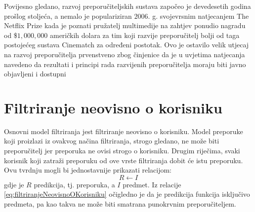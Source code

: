 \documentclass[times, utf8, diplomski, numeric]{fer}
\begin{document}
Povijesno gledano, razvoj preporučiteljskih sustava započeo je devedesetih
godina prošlog stoljeća, a nemalo je populariziran $2006$. g. svojevrsnim
natjecanjem \glqq The Netflix Prize \grqq kada je poznati pružatelj multimedije
na zahtjev ponudio nagradu od \$$1,000,000$ američkih dolara za tim koji razvije
preporučitelj bolji od taga postojećeg sustava \glqq Cinematch \grqq za određeni
postotak.
Ovo je ostavilo velik utjecaj na razvoj preporučitelja prvenstveno zbog
činjenice da je u uvjetima natjecanja navedeno da rezultati i principi rada
razvijenih preporučitelja moraju biti javno objavljeni i dostupni

\section{Filtriranje neovisno o korisniku}
Osnovni model filtriranja jest filtriranje neovisno o korisniku. Model preporuke
koji proizlazi iz ovakvog načina filtriranja, strogo gledano, ne može biti
preporučitelj jer preporuka ne ovisi strogo o korisniku. Drugim riječima, svaki
korisnik koji zatraži preporuku od ove vrste filtriranja dobit će istu
preporuku. Ovu tvrdnju mogli bi jednostavnije prikazati relacijom:
\begin{equation}
\label{eq:filtriranjeNeovisnoOKorisniku}
	R \leftarrow I
\end{equation}
gdje je $R$ predikcija, tj. preporuka, a $I$ predmet. Iz relacije
\ref{eq:filtriranjeNeovisnoOKorisniku} očigledno je da je predikcija funkcija
isključivo predmeta, pa kao takva ne može biti smatrana punokrvnim
preporučiteljem.
\end{document}
